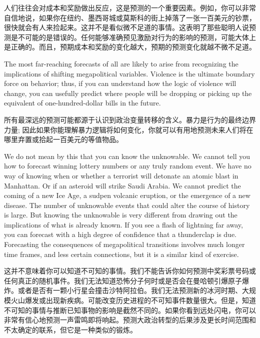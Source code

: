 \begin{Parallel}{97mm}{45mm}
  \ParallelRText
  {人们往往会对成本和奖励做出反应，这是预测的一个重要因素。例如，你可以非常自信地说，如果你在纽约、墨西哥城或莫斯科的街上掉落了一张一百美元的钞票，很快就会有人来捡起来。这并不是看似微不足道的事情。这表明了那些聪明人说预测是不可能的是错误的。任何能够准确预见激励对行为的影响的预测，可能大体上是正确的。而且，预期成本和奖励的变化越大，预期的预测变化就越不微不足道。
  }
  \ParallelPar


  \ParallelLText
  {The most far-reaching forecasts of all are likely to arise from recognizing the implications of shifting megapolitical variables. Violence is the ultimate boundary force on behavior; thus, if you can understand how the logic of violence will change, you can usefully predict where people will be dropping or picking up the equivalent of one-hundred-dollar bills in the future.}
  
  \ParallelRText
  {所有最深远的预测可能都源于认识到政治变量转移的含义。暴力是行为的最终边界力量; 因此如果你能理解暴力逻辑将如何变化，你就可以有用地预测未来人们将在哪里弃置或拾起一百美元的等值物品。}
  \ParallelPar



  \ParallelLText
  {We do not mean by this that you can know the unknowable. We cannot tell you how to forecast winning lottery numbers or any truly random event. We have no way of knowing when or whether a terrorist will detonate an atomic blast in Manhattan. Or if an asteroid will strike Saudi Arabia. We cannot predict the coming of a new Ice Age, a sudpen volcanic eruption, or the emergence of a new disease. The number of unknowable events that could alter the course of history is large. But knowing the unknowable is very different from drawing out the implications of what is already known. If you see a flash of lightning far away, you can forecast with a high degree of confidence that a thunderclap is due. Forecasting the consequences of megapolitical transitions involves much longer time frames, and less certain connections, but it is a similar kind of exercise.}
  
  \ParallelRText
  {这并不意味着你可以知道不可知的事情。我们不能告诉你如何预测中奖彩票号码或任何真正的随机事件。我们无法知道恐怖分子何时或是否会在曼哈顿引爆原子爆炸。或者是否有一颗小行星会撞击沙特阿拉伯。我们无法预测新的冰河时期、大规模火山爆发或出现新疾病。可能改变历史进程的不可知事件数量很大。但是，知道不可知的事情与推断已知事物的影响是截然不同的。如果你看到远处闪电，你可以非常有信心地预测一声雷鸣即将响起。预测大政治转型的后果涉及更长时间范围和不太确定的联系，但它是一种类似的锻炼。}
  \ParallelPar




\end{Parallel}
